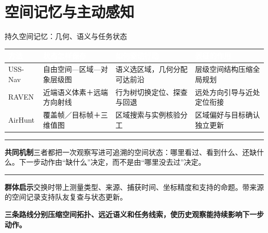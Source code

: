 \documentclass[aspectratio=169,10pt]{beamer}
\def\slidesource{}
\newcommand{\takeaway}[1]{\par\begin{takebox}\fontsize{9.1}{11.5}\selectfont\bfseries\color{navy}#1\end{takebox}}
\newcommand{\ph}[1]{{\color{teal}\rule[-0.35mm]{0.8mm}{3.1mm}}\hspace{1.1mm}\textbf{\color{navy}#1}}
\newcommand{\thd}[1]{\textcolor{white}{\bfseries #1}}
\begin{document}
\section{空间记忆与主动感知}
\gdef\slidesource{文献分析：\href{https://arxiv.org/html/2602.00708v2}{[7] USS-Nav}；\href{https://arxiv.org/html/2509.23563v1}{[10] RAVEN}；\href{https://arxiv.org/html/2601.12742v1}{[8] AirHunt}}
\begin{frame}[t,label=persistent]{持久空间记忆：几何、语义与任务状态}
\relax
{\fontsize{8.7}{11.1}\selectfont
{}
\begin{tabularx}{\linewidth}{@{}Y{0.6}Y{1.08}Y{1.12}Y{1.2}@{}}\toprule
{}\thd{方法} & \thd{状态怎样保存} & \thd{如何驱动行动} & \thd{表征的作用}\\\midrule
USS-Nav & 自由空间—区域—对象层级图 & 语义选区域，几何分配可达前沿 & 层级空间结构压缩全局规划\\
RAVEN & 近端语义体素＋远端方向射线 & 行为树切换定位、探查与回退 & 远处方向引导与近处定位衔接\\
AirHunt & 覆盖帧／目标帧＋三维值图 & 区域搜索与实例核验分工 & 区域偏好与目标确认独立更新\\
\bottomrule\end{tabularx}\par}
\par\ph{共同机制}\quad 三者都把一次观察写进可追溯的空间状态：哪里看过、看到什么、还缺什么。下一步动作由“缺什么”决定，而不是由“哪里没去过”决定。\par\vspace{1mm}
\par\ph{群体启示}\quad 交换时带上测量类型、来源、捕获时间、坐标精度和支持的命题。带来源的空间记录支持队友复查与状态更新。\par\vspace{1mm}
\takeaway{三条路线分别压缩空间拓扑、远近语义和任务线索，使历史观察能持续影响下一步动作。}

\end{frame}
\gdef\slidesource{\href{https://arxiv.org/html/2602.00708v2}{[7] USS-Nav} · §IV–VI；Figs.2–5}
\end{document}
